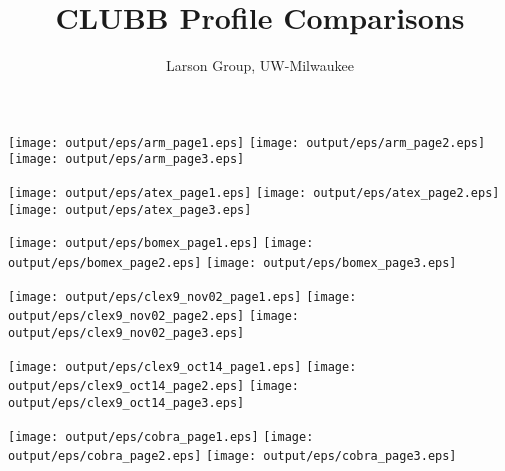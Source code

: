 \documentclass[11pt]{article}
\title{CLUBB Profile Comparisons}
\author{Larson Group, UW-Milwaukee}
\begin{document}
\begin{center}

\texttt{[image: output/eps/arm\_page1.eps]}
\texttt{[image: output/eps/arm\_page2.eps]}
\texttt{[image: output/eps/arm\_page3.eps]}
\end{center}
\newpage

\begin{center}

\texttt{[image: output/eps/atex\_page1.eps]}
\texttt{[image: output/eps/atex\_page2.eps]}
\texttt{[image: output/eps/atex\_page3.eps]}
\end{center}
\newpage


\begin{center}

\texttt{[image: output/eps/bomex\_page1.eps]}
\texttt{[image: output/eps/bomex\_page2.eps]}
\texttt{[image: output/eps/bomex\_page3.eps]}
\end{center}
\newpage

\begin{center}

\texttt{[image: output/eps/clex9\_nov02\_page1.eps]}
\texttt{[image: output/eps/clex9\_nov02\_page2.eps]}
\texttt{[image: output/eps/clex9\_nov02\_page3.eps]}
\end{center}
\newpage

\begin{center}

\texttt{[image: output/eps/clex9\_oct14\_page1.eps]}
\texttt{[image: output/eps/clex9\_oct14\_page2.eps]}
\texttt{[image: output/eps/clex9\_oct14\_page3.eps]}
\end{center}
\newpage

\begin{center}

\texttt{[image: output/eps/cobra\_page1.eps]}
\texttt{[image: output/eps/cobra\_page2.eps]}
\texttt{[image: output/eps/cobra\_page3.eps]}
\end{center}
\newpage
\end{document}
